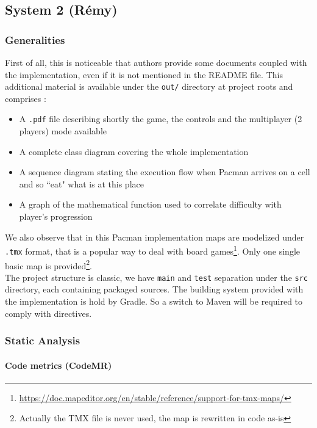 \documentclass[]{article}
\begin{document}
\newpage
\subsection{System 2 (Rémy)}
\subsubsection{Generalities}

First of all, this is noticeable that authors provide some documents coupled with the implementation, even if it is not mentioned in the README file. This additional material is available under the \texttt{out/} directory at project roots and comprises :
\vspace{0.1cm}
\begin{itemize}
\item A \texttt{.pdf} file describing shortly the game, the controls and the multiplayer (2 players) mode available

\item A complete class diagram covering the whole implementation

\item A sequence diagram stating the execution flow when Pacman arrives on a cell and so ``eat" what is at this place

\item A graph of the mathematical function used to correlate difficulty with player's progression
\end{itemize}

We also observe that in this Pacman implementation maps are modelized under \texttt{.tmx} format, that is a popular way to deal with board games\footnote{\url{https://doc.mapeditor.org/en/stable/reference/support-for-tmx-maps/}}. Only one single basic map is provided\footnote{Actually the TMX file is never used, the map is rewritten in code as-is}.\\

The project structure is classic, we have \texttt{main} and \texttt{test} separation under the \texttt{src} directory, each containing packaged sources. The building system provided with the implementation is hold by Gradle. So a switch to Maven will be required to comply with directives.


\subsubsection{Static Analysis}

\paragraph{Code metrics (CodeMR)}
\end{document}
